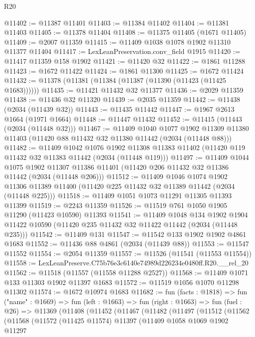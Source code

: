 \begin{lexlean}{R20}
\begin{coremodule}
@11402 := @11387 @11401
@11403 := @11384 @11402
@11404 := @11381 @11403
@11405 := @11378 @11404
@11408 := @11375 @11405 (@1671 @11405)
@11409 := @2007 @11359
@11415 := @11409 @1038 @1078 @1902 @11310 @11377 @11404
@11417 := LexLeanPreservation.conv_field @1915
@11420 := @11417 @11359 @158 @1902
@11421 := @11420 @32
@11422 := @1861 @11288
@11423 := @1672 @11422
@11424 := @1861 @11300
@11425 := @1672 @11424
@11432 := @11378 (@11381 (@11384 (@11387 (@11390 (@11423 (@11425 @1683))))))
@11435 := @11421 @11432 @32 @11377
@11436 := @2029 @11359
@11438 := @11436 @32 @11320
@11439 := @2035 @11359
@11442 := @11438 (@2034 (@11439 @32))
@11443 := @11435 @11442
@11447 := @1967 @2613 @1664 (@1971 @1664)
@11448 := @11447 @11432
@11452 := @11415 (@11443 (@2034 (@11448 @32)))
@11467 := @11409
    @1040
    @1077
    @1902
    @11309
    @11380
    @11403
    (@11420 @88 @11432 @32 @11380 @11442 (@2034 (@11448 @88)))
@11482 := @11409
    @1042
    @1076
    @1902
    @11308
    @11383
    @11402
    (@11420 @119 @11432 @32 @11383 @11442 (@2034 (@11448 @119)))
@11497 := @11409
    @1044
    @1075
    @1902
    @11307
    @11386
    @11401
    (@11420 @206 @11432 @32 @11386 @11442 (@2034 (@11448 @206)))
@11512 := @11409
    @1046
    @1074
    @1902
    @11306
    @11389
    @11400
    (@11420 @225 @11432 @32 @11389 @11442 (@2034 (@11448 @225)))
@11518 := @11409 @1051 @1073 @11291 @11305 @11393 @11399
@11519 := @2243 @11359
@11526 := @11519 @761 @1050 @1905 @11290 (@11423 @10590) @11393
@11541 := @11409
    @1048
    @134
    @1902
    @1904
    @11422
    @10590
    (@11420 @235 @11432 @32 @11422 @11442 (@2034 (@11448 @235)))
@11542 := @11409 @131
@11547 := @11542 @133 @1902 @1902 @4861 @1683
@11552 := @11436 @88 @4861 (@2034 (@11439 @88))
@11553 := @11547 @11552
@11554 := @2054 @11359
@11557 := @11526 (@11541 (@11553 @11554))
@11558 := LexLeanPreserve.C75b76e3c6140e74989d226234e0480ff.R20.__rel_20
@11562 := @11518 (@11557 (@11558 @11288 @2527))
@11568 := @11409 @1071 @133 @11303 @1902 @11397 @1683
@11572 := @11519 @1056 @1070 @11298 @11302
@11574 := @1672 @10974 @1683
@11682 := fun (facts : @1818) =>
  fun ("name" : @1669) =>
  fun (left : @1663) =>
  fun (right : @1663) =>
  fun (fuel : @26) =>
  @11369
    (@11408
      (@11452
        (@11467
          (@11482
            (@11497
              (@11512
                (@11562
                  (@11568
                    (@11572
                      (@11425 @11574)
                      @11397
                      (@11409
                        @1058
                        @1069
                        @1902
                        @11297

\end{coremodule}
\end{lexlean}
